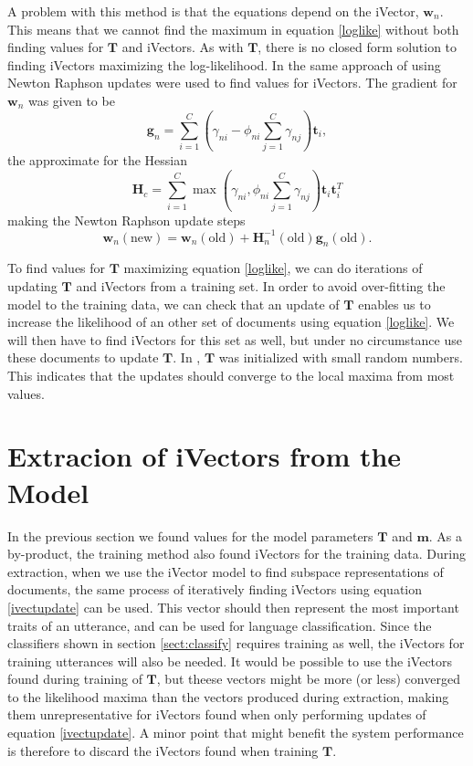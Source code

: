 A problem with this method is that the equations depend on the iVector, $\mathbf{w}_n$. This means that we cannot find the maximum in equation \ref{loglike} without both finding values for $\mathbf{T}$ and iVectors. As with $\mathbf{T}$, there is no closed form solution to finding iVectors maximizing the log-likelihood. In \cite{srivector} the same approach of using Newton Raphson updates were used to find values for iVectors. The gradient for $\mathbf{w}_n$ was given to be
\begin{equation}
\label{ivectgrad}
\mathbf{g}_n = \sum_{i=1}^C \left(\gamma_{ni}-\phi_{ni}\sum_{j=1}^C \gamma_{nj}\right)\mathbf{t}_i,
\end{equation}
the approximate for the Hessian
\begin{equation}
\label{ivecthessian}
\mathbf{H}_c = \sum_{i=1}^C \max\left(\gamma_{ni}, \phi_{ni}\sum_{j=1}^C \gamma_{nj}\right)\mathbf{t}_i \mathbf{t}_i^T
\end{equation}
making the Newton Raphson update steps
\begin{equation}
\label{ivectupdate}
\mathbf{w}_n(\text{new}) = \mathbf{w}_n(\text{old})+\mathbf{H}_n^{-1}(\text{old})\mathbf{g}_n(\text{old}).
\end{equation}

To find values for $\mathbf{T}$ maximizing equation \ref{loglike}, we can do iterations of updating $\mathbf{T}$ and iVectors from a training set. In order to avoid over-fitting the model to the training data, we can check that an update of $\mathbf{T}$ enables us to increase the likelihood of an other set of documents using equation \ref{loglike}. We will then have to find iVectors for this set as well, but under no circumstance use these documents to update $\mathbf{T}$. In \cite{lrivector}, $\mathbf{T}$ was initialized with small random numbers. This indicates that the updates should converge to the local maxima from most values. 

\section{Extracion of iVectors from the Model}
\label{sect:ivectextract}

In the previous section we found values for the model parameters $\mathbf{T}$ and $\mathbf{m}$. As a by-product, the training method also found iVectors for the training data. During extraction, when we use the iVector model to find subspace representations of documents, the same process of iteratively finding iVectors using equation \ref{ivectupdate} can be used. This vector should then represent the most important traits of an utterance, and can be used for language classification. Since the classifiers shown in section \ref{sect:classify} requires training as well, the iVectors for training utterances will also be needed. It would be possible to use the iVectors found during training of $\mathbf{T}$, but theese vectors might be more (or less) converged to the likelihood maxima than the vectors produced during extraction, making them unrepresentative for iVectors found when only performing updates of equation \ref{ivectupdate}.  A minor point that might benefit the system performance is therefore to discard the iVectors found when training $\mathbf{T}$.

